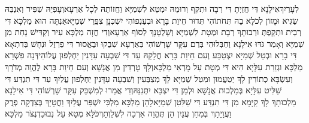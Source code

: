 \documentclass[../main/main.tex]{subfiles}
\begin{document}
\begin{multicols*}{\ncols}
לְעָרַיִךְ\PreVerseSpace{}אִילָנָא דִּי חֲזַיְתָ דִּי רְבָה וּתְקִף וְרוּמֵהּ יִמְטֵא לִשְׁמַיָּא וַחֲזוֹתֵהּ לְכָל אַרְעָא\PreVerseSpace{}וְעָפְיֵהּ שַׁפִּיר וְאִנְבֵּהּ שַׂגִּיא וּמָזוֹן לְכֹלָּא בֵהּ תְּחֹתוֹהִי תְּדוּר חֵיוַת בָּרָא וּבְעַנְפוֹהִי יִשְׁכְּנָן צִפֲּרֵי שְׁמַיָּא\PreVerseSpace{}אַנְתָּה הוּא מַלְכָּא דִּי רְבַית וּתְקֵפְתְּ וּרְבוּתָךְ רְבָת וּמְטָת לִשְׁמַיָּא וְשָׁלְטָנָךְ לְסוֹף אַרְעָא\PreVerseSpace{}וְדִי חֲזָה מַלְכָּא עִיר וְקַדִּישׁ נָחִת מִן שְׁמַיָּא וְאָמַר גֹּדּוּ אִילָנָא וְחַבְּלוּהִי בְּרַם עִקָּר שָׁרְשׁוֹהִי בְּאַרְעָא שְׁבֻקוּ וּבֶאֱסוּר דִּי פַרְזֶל וּנְחָשׁ בְּדִתְאָא דִּי בָרָא וּבְטַל שְׁמַיָּא יִצְטַבַּע וְעִם חֵיוַת בָּרָא חֲלָקֵהּ עַד דִּי שִׁבְעָה עִדָּנִין יַחְלְפוּן עֲלוֹהִי\PreVerseSpace{}דְּנָה פִשְׁרָא מַלְכָּא וּגְזֵרַת עִלָּיָא הִיא דִּי מְטָת עַל מָרְאִי מַלְכָּא\PreVerseSpace{}וְלָךְ טָרְדִין מִן אֲנָשָׁא וְעִם חֵיוַת בָּרָא לֶהֱוֵה מְדֹרָךְ וְעִשְׂבָּא כְתוֹרִין לָךְ יְטַעֲמוּן וּמִטַּל שְׁמַיָּא לָךְ מְצַבְּעִין וְשִׁבְעָה עִדָּנִין יַחְלְפוּן עֲלַיִךְ עַד דִּי תִנְדַּע דִּי שַׁלִּיט עִלָּיָא בְּמַלְכוּת אֲנָשָׁא וּלְמַן דִּי יִצְבֵּא יִתְּנִנַּהּ\PreVerseSpace{}וְדִי אֲמַרוּ לְמִשְׁבַּק עִקָּר שָׁרְשׁוֹהִי דִּי אִילָנָא מַלְכוּתָךְ לָךְ קַיָּמָא מִן דִּי תִנְדַּע דִּי שַׁלִּטִן שְׁמַיָּא\PreVerseSpace{}לָהֵן מַלְכָּא מִלְכִּי יִשְׁפַּר עֲלַיִךְ וַחֲטָיָךְ בְּצִדְקָה פְרֻק וַעֲוָיָתָךְ בְּמִחַן עֲנָיִן הֵן תֶּהֱוֵה אַרְכָה לִשְׁלֵוְתָךְ\PreVerseSpace{}כֹּלָּא מְטָא עַל נְבוּכַדְנֶצֹּר מַלְכָּא\OpenSection{}\par

\end{multicols*}
\end{document}
